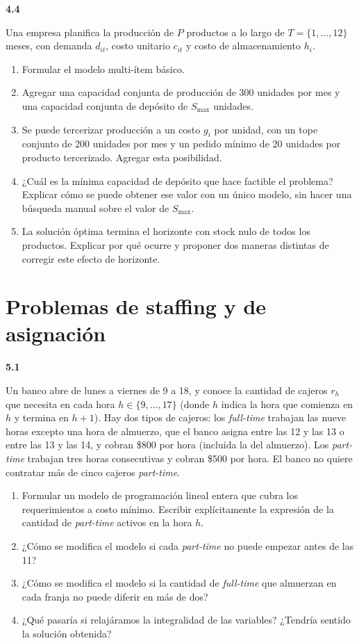 \documentclass[11pt,a4paper]{article}
\newcommand{\ejercicio}[1]{\par\medskip\noindent\textbf{#1}\par\nopagebreak\smallskip}
\begin{document}
\ejercicio{4.4}
Una empresa planifica la producción de $P$ productos a lo largo de
$T = \{1,\dots,12\}$ meses, con demanda $d_{it}$, costo unitario $c_{it}$ y
costo de almacenamiento $h_i$.
\begin{enumerate}
  \item Formular el modelo multi-ítem básico.
  \item Agregar una capacidad conjunta de producción de 300 unidades por mes y
  una capacidad conjunta de depósito de $S_{\max}$ unidades.
  \item Se puede tercerizar producción a un costo $g_i$ por unidad, con un tope
  conjunto de 200 unidades por mes y un pedido mínimo de 20 unidades por
  producto tercerizado. Agregar esta posibilidad.
  \item ¿Cuál es la mínima capacidad de depósito que hace factible el problema?
  Explicar cómo se puede obtener ese valor con un único modelo, sin hacer una
  búsqueda manual sobre el valor de $S_{\max}$.
  \item La solución óptima termina el horizonte con stock nulo de todos los
  productos. Explicar por qué ocurre y proponer dos maneras distintas de
  corregir este efecto de horizonte.
\end{enumerate}

\section{Problemas de staffing y de asignación}

\ejercicio{5.1}
Un banco abre de lunes a viernes de 9 a 18, y conoce la cantidad de cajeros
$r_h$ que necesita en cada hora $h \in \{9,\dots,17\}$ (donde $h$ indica la hora
que comienza en $h$ y termina en $h+1$). Hay dos tipos de cajeros: los
\emph{full-time} trabajan las nueve horas excepto una hora de almuerzo, que el
banco asigna entre las 12 y las 13 o entre las 13 y las 14, y cobran \$800 por
hora (incluida la del almuerzo). Los \emph{part-time} trabajan tres horas
consecutivas y cobran \$500 por hora. El banco no quiere contratar más de cinco
cajeros \emph{part-time}.
\begin{enumerate}
  \item Formular un modelo de programación lineal entera que cubra los
  requerimientos a costo mínimo. Escribir explícitamente la expresión de la
  cantidad de \emph{part-time} activos en la hora $h$.
  \item ¿Cómo se modifica el modelo si cada \emph{part-time} no puede empezar
  antes de las 11?
  \item ¿Cómo se modifica el modelo si la cantidad de \emph{full-time} que
  almuerzan en cada franja no puede diferir en más de dos?
  \item ¿Qué pasaría si relajáramos la integralidad de las variables? ¿Tendría
  sentido la solución obtenida?
\end{enumerate}
\end{document}
